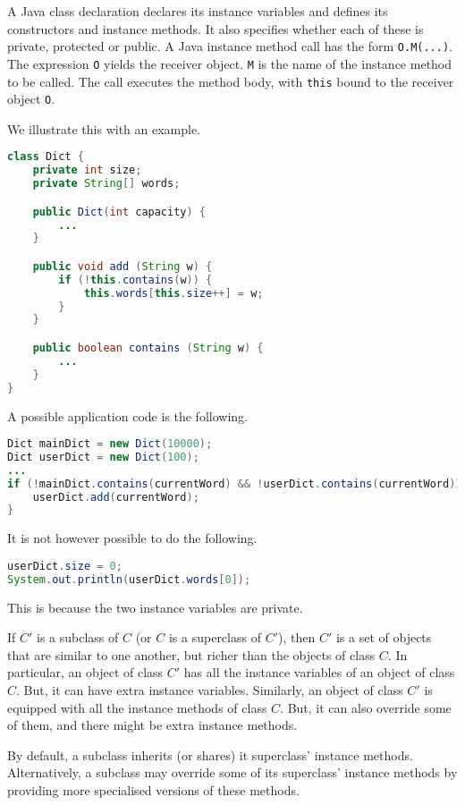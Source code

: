 \documentclass[a4paper, openany]{memoir}
\begin{document}
A Java class declaration declares its instance variables and defines its constructors and instance methods. It also specifies whether each of these is private, protected or public. A Java instance method call has the form \texttt{O.M(...)}. The expression \texttt{O} yields the receiver object. \texttt{M} is the name of the instance method to be called. The call executes the method body, with \texttt{this} bound to the receiver object \texttt{O}.

We illustrate this with an example.
\begin{lstlisting}[language=java]
class Dict {
    private int size;
    private String[] words;

    public Dict(int capacity) {
        ...
    }

    public void add (String w) {
        if (!this.contains(w)) {
            this.words[this.size++] = w;
        }
    }

    public boolean contains (String w) {
        ...
    }
}
\end{lstlisting}
A possible application code is the following.
\begin{lstlisting}[language=java]
Dict mainDict = new Dict(10000);
Dict userDict = new Dict(100);
...
if (!mainDict.contains(currentWord) && !userDict.contains(currentWord)) {
    userDict.add(currentWord);
}
\end{lstlisting}
It is not however possible to do the following.
\begin{lstlisting}[language=java]
userDict.size = 0;
System.out.println(userDict.words[0]);
\end{lstlisting}
This is because the two instance variables are private.

If $C'$ is a subclass of $C$ (or $C$ is a superclass of $C'$), then $C'$ is a set of objects that are similar to one another, but richer than the objects of class $C$. In particular, an object of class $C'$ has all the instance variables of an object of class $C$. But, it can have extra instance variables. Similarly, an object of class $C'$ is equipped with all the instance methods of class $C$. But, it can also override some of them, and there might be extra instance methods.

By default, a subclass inherits (or shares) it superclass' instance methods. Alternatively, a subclass may override some of its superclass' instance methods by providing more specialised versions of these methods.
\end{document}
